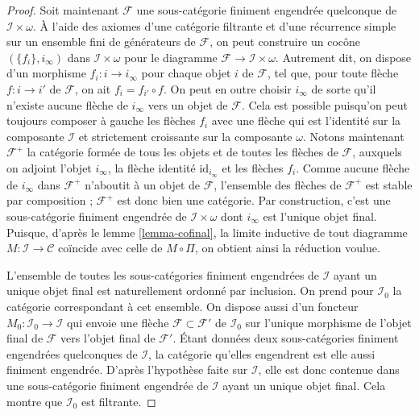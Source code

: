 \begin{proof}
\medskip\noindent
Soit maintenant $\mathcal{F}$ une sous-catégorie finiment engendrée
quelconque de $\mathcal{I}\times \omega$. À l'aide des axiomes d'une catégorie
filtrante et d'une récurrence simple sur un ensemble fini de générateurs de
$\mathcal{F}$, on peut construire un cocône $(\{f_i\}, i_\infty)$ dans
$\mathcal{I} \times \omega$ pour le diagramme
$\mathcal{F} \to \mathcal{I} \times \omega$. Autrement dit, on dispose d'un
morphisme $f_i : i \to i_\infty$ pour chaque objet $i$ de $\mathcal{F}$,
tel que, pour toute flèche $f : i \to i'$ de $\mathcal{F}$, on ait
$f_i = f_{i'} \circ f$. On peut en outre choisir $i_\infty$ de sorte qu'il
n'existe aucune flèche de $i_\infty$ vers un objet de $\mathcal{F}$. Cela est
possible puisqu'on peut toujours composer à gauche les flèches $f_i$ avec
une flèche qui est l'identité sur la composante $\mathcal{I}$ et strictement
croissante sur la composante $\omega$.
Notons maintenant $\mathcal{F}^+$ la catégorie formée de tous les objets et
de toutes les flèches de $\mathcal{F}$, auxquels on adjoint l'objet
$i_\infty$, la flèche identité $\text{id}_{i_\infty}$ et les flèches $f_i$.
Comme aucune flèche de $i_\infty$ dans $\mathcal{F}^+$ n'aboutit à un objet de
$\mathcal{F}$, l'ensemble des flèches de $\mathcal{F}^+$ est stable par
composition ; $\mathcal{F}^+$ est donc bien une catégorie. Par construction,
c'est une sous-catégorie finiment engendrée de $\mathcal{I}\times\omega$ dont
$i_\infty$ est l'unique objet final. Puisque, d'après le
lemme \ref{lemma-cofinal}, la limite inductive de tout diagramme
$M : \mathcal{I} \to \mathcal{C}$ coïncide avec celle de $M\circ\Pi$, on
obtient ainsi la réduction voulue.

\medskip\noindent
L'ensemble de toutes les sous-catégories finiment engendrées de
$\mathcal{I}$ ayant un unique objet final est naturellement ordonné par
inclusion. On prend pour $\mathcal{I}_0$ la catégorie correspondant à cet
ensemble. On dispose aussi d'un foncteur
$M_0 : \mathcal{I}_0 \to \mathcal{I}$ qui envoie une flèche
$\mathcal{F} \subset \mathcal{F'}$ de $\mathcal{I}_0$ sur l'unique morphisme
de l'objet final de $\mathcal{F}$ vers l'objet final de $\mathcal{F}'$.
Étant données deux sous-catégories finiment engendrées quelconques de
$\mathcal{I}$, la catégorie qu'elles engendrent est elle aussi finiment
engendrée. D'après l'hypothèse faite sur $\mathcal{I}$, elle est donc contenue
dans une sous-catégorie finiment engendrée de $\mathcal{I}$ ayant un unique
objet final. Cela montre que $\mathcal{I}_0$ est filtrante.


\end{proof}
